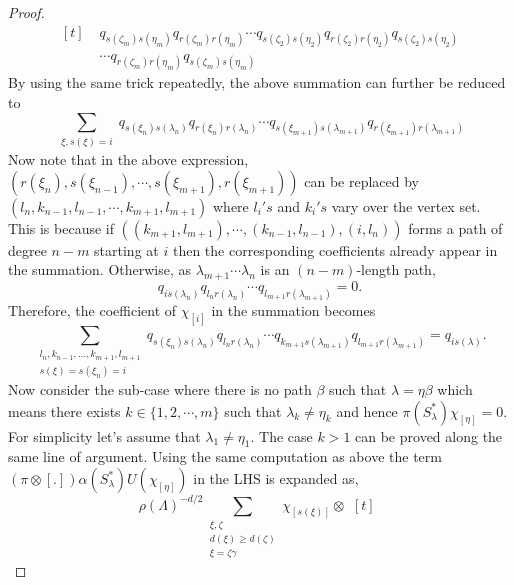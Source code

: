 \documentclass[10pt,a4paper]{amsart}
\begin{document}
\begin{proof}
\begin{equation*}
\begin{aligned}[t]
&\;q_{s(\zeta_{m})s(\eta_{m})}q_{r(\zeta_{m})r(\eta_{m})}\cdots q_{s(\zeta_{2})s(\eta_{2})}q_{r(\zeta_{2})r(\eta_{2})}q_{s(\zeta_{2})s(\eta_{2})}\\
&\;\cdots q_{r(\zeta_{m})r(\eta_{m})}q_{s(\zeta_{m})s(\eta_{m})}
\end{aligned}
\end{equation*}
By using the same trick repeatedly, the above summation can further be reduced to
\begin{equation*}
    \sum\limits_{\substack{\xi,
s(\xi)=i}}q_{s(\xi_{n})s(\lambda_{n})}q_{r(\xi_{n})r(\lambda_{n})}\cdots q_{s(\xi_{m+1})s(\lambda_{m+1})}q_{r(\xi_{m+1})r(\lambda_{m+1})}
\end{equation*}
Now note that in the above expression, $(r(\xi_{n}),s(\xi_{n-1}),\cdots, s(\xi_{m+1}),r(\xi_{m+1}))$ can be replaced by $(l_{n},k_{n-1},l_{n-1},\cdots,k_{m+1},l_{m+1})$ where $l_{i}'s$ and $k_{i}'s$ vary over the vertex set. This is because if $((k_{m+1},l_{m+1}),\cdots,(k_{n-1},l_{n-1}),(i,l_{n}))$ forms a path of degree $n-m$ starting at $i$ then the corresponding coefficients already appear in the summation. Otherwise, as $\lambda_{m+1}\cdots\lambda_{n}$ is an $(n-m)$-length path, \begin{displaymath}q_{is(\lambda_{n})}q_{l_{n}r(\lambda_{n})}\cdots q_{l_{m+1}r(\lambda_{m+1})}=0.\end{displaymath} Therefore, the coefficient of $\chi_{[i]}$ in the summation becomes
\begin{equation*}
    \sum\limits_{\substack{l_{n},k_{n-1},\ldots,k_{m+1},l_{m+1}\\s(\xi)=s(\xi_{n})=i}}q_{s(\xi_{n})s(\lambda_{n})}q_{l_{n}r(\lambda_{n})}\cdots q_{k_{m+1}s(\lambda_{m+1})}q_{l_{m+1}r(\lambda_{m+1})}=q_{is(\lambda)}.
\end{equation*}
Now consider the sub-case where there is no path $\beta$ such that $\lambda=\eta\beta$ which means there exists $k\in\{1,2,\cdots,m\}$ such that $\lambda_{k}\neq \eta_{k}$  and hence $\pi(S_{\lambda}^{\ast})\chi_{[\eta]}=0$. For simplicity let's assume that $\lambda_{1}\neq \eta_{1}$. The case $k>1$ can be proved along the same line of argument. Using the same computation as above the term $(\pi\otimes [.]) \alpha(S_{\lambda}^{\ast})U(\chi_{[\eta]})$ in the LHS is expanded as,
\begin{equation*}
    \rho(\Lambda)^{-d/2}\sum\limits_{\substack{\xi,\zeta\\ d(\xi)\geq d(\zeta) \\ \xi=\zeta\gamma}}\chi_{[s(\xi)]}\otimes 
\begin{aligned}[t]

\end{aligned}
\end{equation*}
\end{proof}
\end{document}
